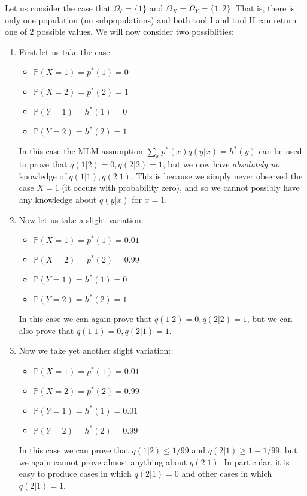 \begin{itemize}
Let us consider the case that $\Omega_\ell = \{1\}$ and $\Omega_X=\Omega_Y=\{1,2\}$.  That is, there is only one population (no subpopulations) and both tool I and tool II can return one of $2$ possible values.  We will now consider two possiblities:
\begin{enumerate}
\item First let us take the case
    \begin{itemize}
    \item $\mathbb{P}(X=1)=p^*(1)=0$
    \item $\mathbb{P}(X=2)=p^*(2)=1$
    \item $\mathbb{P}(Y=1)=h^*(1)=0$
    \item $\mathbb{P}(Y=2)=h^*(2)=1$
    \end{itemize}
    In this case the MLM assumption $\sum_x p^*(x)q(y|x)=h^*(y)$ can be used to prove that $q(1|2)=0,q(2|2)=1$, but we now have \emph{absolutely no} knowledge of $q(1|1),q(2|1)$.  This is because we simply never observed the case $X=1$ (it occurs with probability zero), and so we cannot possibly have any knowledge about $q(y|x)$ for $x=1$.  
\item Now let us take a slight variation:
    \begin{itemize}
    \item $\mathbb{P}(X=1)=p^*(1)=0.01$
    \item $\mathbb{P}(X=2)=p^*(2)=0.99$
    \item $\mathbb{P}(Y=1)=h^*(1)=0$
    \item $\mathbb{P}(Y=2)=h^*(2)=1$
    \end{itemize}
    In this case we can again prove that $q(1|2)=0,q(2|2)=1$, but we can also prove that $q(1|1)=0,q(2|1)=1$.  
\item Now we take yet another slight variation:
    \begin{itemize}
    \item $\mathbb{P}(X=1)=p^*(1)=0.01$
    \item $\mathbb{P}(X=2)=p^*(2)=0.99$
    \item $\mathbb{P}(Y=1)=h^*(1)=0.01$
    \item $\mathbb{P}(Y=2)=h^*(2)=0.99$
    \end{itemize}
    In this case we can prove that $q(1|2)\leq 1/99$ and $q(2|1)\geq 1-1/99$, but we again cannot prove almost anything about $q(2|1)$.  In particular, it is easy to produce cases in which $q(2|1)=0$ and other cases in which $q(2|1)=1$.  

\end{enumerate}


\end{itemize}
